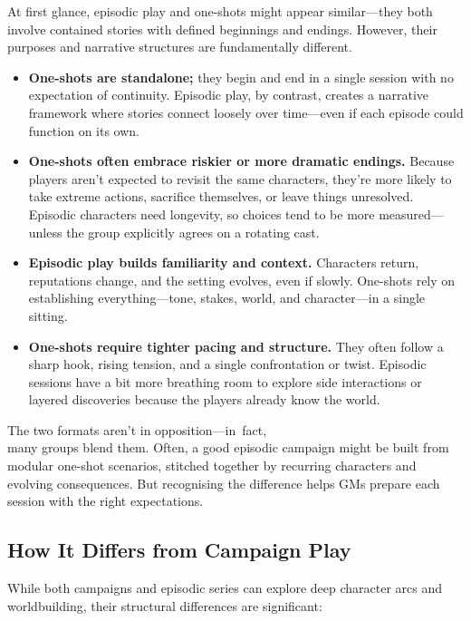 At first glance, episodic play and one-shots might appear similar—they both involve contained stories with defined beginnings and endings. However, their purposes and narrative structures are fundamentally different.

\begin{itemize}\raggedright
    \item \textbf{One-shots are standalone;} they begin and end in a single session with no expectation of continuity. Episodic play, by contrast, creates a narrative framework where stories connect loosely over time—even if each episode could function on its own.

    \item \textbf{One-shots often embrace riskier or more dramatic endings.} Because players aren’t expected to revisit the same characters, they’re more likely to take extreme actions, sacrifice themselves, or leave things unresolved. Episodic characters need longevity, so choices tend to be more measured—unless the group explicitly agrees on a rotating cast.

    \item \textbf{Episodic play builds familiarity and context.} Characters return, reputations change, and the setting evolves, even if slowly. One-shots rely on establishing everything—tone, stakes, world, and character—in a single sitting.

    \item \textbf{One-shots require tighter pacing and structure.} They often follow a sharp hook, rising tension, and a single confrontation or twist. Episodic sessions have a bit more breathing room to explore side interactions or layered discoveries because the players already know the world.
\end{itemize}

The two formats aren’t in opposition—in~fact,\\ many groups blend them. Often, a good episodic campaign might be built from modular one-shot scenarios, stitched together by recurring characters and evolving consequences. But recognising the difference helps GMs prepare each session with the right expectations.


\subsection*{How It Differs from Campaign Play}

While both campaigns and episodic series can explore deep character arcs and worldbuilding, their structural differences are significant:

